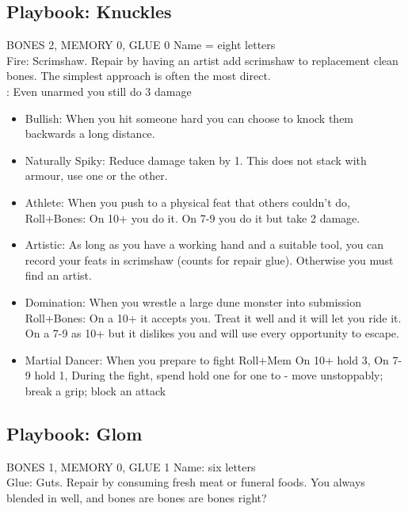 \subsection{Playbook: Knuckles}
BONES 2, MEMORY 0, GLUE 0  
Name = eight letters
\\Fire: Scrimshaw. Repair by having an artist add scrimshaw to replacement clean bones.
The simplest approach is often the most direct.
\\: Even unarmed you still do 3 damage
\begin{itemize}
\item  Bullish: When you hit someone hard you can choose to knock them backwards a long distance.
\item  Naturally Spiky: Reduce damage taken by 1. This does not stack with armour, use one or the other. 
\item  Athlete: When you push to a physical feat that others couldn't do, Roll+Bones:
\myitem On 10+ you do it.
\myitemend On 7-9 you do it but take 2 damage.
\item  Artistic: As long as you have a working hand and a suitable tool, you can record your feats in scrimshaw (counts for repair glue). Otherwise you must find an artist.
\item  Domination: When you wrestle a large dune monster into submission Roll+Bones: 
\myitem On a 10+ it accepts you. Treat it well and it will let you ride it.
\myitemend On a 7-9 as 10+ but it dislikes you and will use every opportunity to escape.
\item  Martial Dancer: When you prepare to fight Roll+Mem
\myitem On 10+ hold 3,
\myitem On 7-9 hold 1,
\myitemend During the fight, spend hold one for one to - move unstoppably; break a grip; block an attack\end{itemize}


\newpage
\subsection{Playbook: Glom}
BONES 1, MEMORY 0, GLUE 1  
Name: six letters
\\ Glue: Guts. Repair by consuming fresh meat or funeral foods.
You always blended in well, and bones are bones are bones right?

